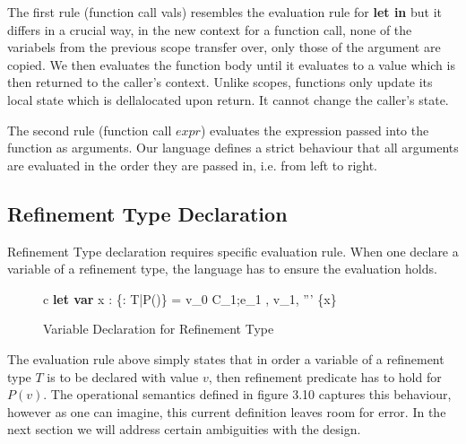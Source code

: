 \documentclass[a4paper,12pt]{report}
\begin{document}
\par
The first rule (function call vals) resembles the evaluation rule for 
\textbf{let in} but it differs in a crucial way, in the new context for a 
function call, none of the variabels from the previous scope transfer over, only 
those of the argument are copied. We then evaluates the function body until it 
evaluates to a value which is then returned to the caller's context. Unlike 
scopes, functions only update its local state which is dellalocated upon return. 
It cannot change the caller's state. 

\par
The second rule (function call $expr$) evaluates the expression passed into the 
function as arguments. Our language defines a strict behaviour that all 
arguments are evaluated in the order they are passed in, i.e. from left to right. 

\subsection{Refinement Type Declaration}
Refinement Type declaration requires specific evaluation rule. When one declare 
a variable of a refinement type, the language has to ensure the evaluation 
holds. 

\begin{figure}[H]
  \begin{center}
    \begin{tabular}{c}
      {\langle\textbf{let var }x : \{\upsilon : T\text{ }|\text{ }P(\upsilon)\} = v_0  C_1;e_1 , \sigma \rangle 
      \Longrightarrow \langle v_1, \sigma''' \setminus \{x\} \rangle}
    \end{tabular}
  \end{center}
  \caption{Variable Declaration for Refinement Type}
\end{figure}

\par
The evaluation rule above simply states that in order a variable of a 
refinement type $T$ is to be declared with value $v$, 
then refinement predicate has to hold for $P(v)$. The operational semantics 
defined in figure 3.10 captures this behaviour, however as one can imagine, this 
current definition leaves room for error. In the next section we will address 
certain ambiguities with the design.
\end{document}
